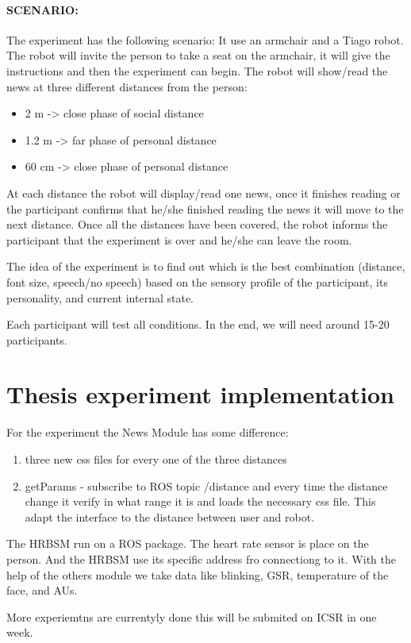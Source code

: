 \paragraph{SCENARIO:}
The experiment has the following scenario:
It use an armchair and a Tiago robot.
The robot will invite the person to take a seat on the armchair, it will give the instructions and then the experiment can begin.
The robot will show/read the news at three different distances from the person:
\begin{itemize}
\item 2 m -> close phase of social distance
\item 1.2 m -> far phase of personal distance
\item 60 cm -> close phase of personal distance
\end{itemize}
At each distance the robot will display/read one news, once it finishes reading or the participant confirms that he/she finished reading the news it will move to the next distance.
Once all the distances have been covered, the robot informs the participant that the experiment is over and he/she can leave the room.


The idea of the experiment is to find out which is the best combination (distance, font size, speech/no speech) based on the sensory profile of the participant,
its personality, and current internal state. 

Each participant will test all conditions. In the end, we will need around 15-20 participants.

\section{Thesis experiment implementation}
For the experiment the News Module has some difference:
\begin{enumerate}
    \item three new css files for every one of the three distances
    \item getParams - subscribe to ROS topic /distance and every time the distance change
    it verify in what range it is and loads the necessary css file. This adapt the interface to
    the distance between user and robot.
\end{enumerate}
The HRBSM run on a ROS package. The heart rate sensor is place on the person.
And the HRBSM use its specific address fro connectiong to it. With the help of the
others module we take data like blinking, GSR, temperature of the face, and AUs.

More experiemtns are currentyly done this will be submited on ICSR in one week.


